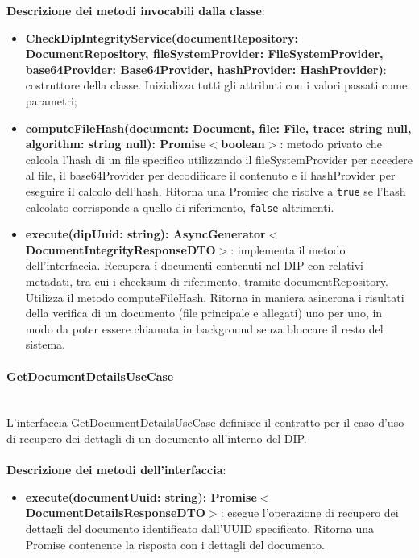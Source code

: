 \documentclass[a4paper,12pt]{article}
\begin{document}
{{              \noindent \textbf{Descrizione dei metodi invocabili dalla classe}:
                \begin{itemize}
                    \item \textbf{CheckDipIntegrityService(documentRepository: DocumentRepository, fileSystemProvider: FileSystemProvider, base64Provider: Base64Provider, hashProvider: HashProvider)}: costruttore della classe. Inizializza tutti gli attributi con i valori passati come parametri;
                    \item \textbf{computeFileHash(document: Document, file: File, trace: string \textbar null, algorithm: string \textbar null): Promise$<$boolean$>$}: metodo privato che calcola l'hash di un file specifico utilizzando il fileSystemProvider per accedere al file, il base64Provider per decodificare il contenuto e il hashProvider per eseguire il calcolo dell'hash. Ritorna una Promise che risolve a \texttt{true} se l'hash calcolato corrisponde a quello di riferimento, \texttt{false} altrimenti.
                    \item \textbf{execute(dipUuid: string): AsyncGenerator$<$DocumentIntegrityResponseDTO$>$}: implementa il metodo dell'interfaccia. Recupera i documenti contenuti nel DIP con relativi metadati, tra cui i checksum di riferimento, tramite documentRepository. Utilizza il metodo computeFileHash. Ritorna in maniera asincrona i risultati della verifica di un documento (file principale e allegati) uno per uno, in modo da poter essere chiamata in background senza bloccare il resto del sistema.
                \end{itemize}
                \paragraph{GetDocumentDetailsUseCase}\label{par:GetDocumentDetailsUseCase}\mbox{}\\
                L'interfaccia GetDocumentDetailsUseCase definisce il contratto per il caso d'uso di recupero dei dettagli di un documento all'interno del DIP.\\
                \\
              \noindent \textbf{Descrizione dei metodi dell'interfaccia}:
                \begin{itemize}
                    \item \textbf{execute(documentUuid: string): Promise$<$DocumentDetailsResponseDTO$>$}: esegue l'operazione di recupero dei dettagli del documento identificato dall'UUID specificato. Ritorna una Promise contenente la risposta con i dettagli del documento.
                \end{itemize}
}}
\end{document}
